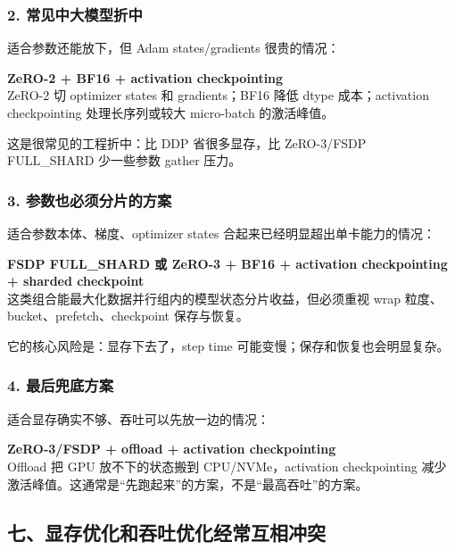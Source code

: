 \subsubsection*{2. 常见中大模型折中}

适合参数还能放下，但 Adam states/gradients 很贵的情况：

\begin{summarybox}
\textbf{ZeRO-2 + BF16 + activation checkpointing}\\
ZeRO-2 切 optimizer states 和 gradients；BF16 降低 dtype 成本；activation checkpointing 处理长序列或较大 micro-batch 的激活峰值。
\end{summarybox}

这是很常见的工程折中：比 DDP 省很多显存，比 ZeRO-3/FSDP FULL\_SHARD 少一些参数 gather 压力。

\subsubsection*{3. 参数也必须分片的方案}

适合参数本体、梯度、optimizer states 合起来已经明显超出单卡能力的情况：

\begin{summarybox}
\textbf{FSDP FULL\_SHARD 或 ZeRO-3 + BF16 + activation checkpointing + sharded checkpoint}\\
这类组合能最大化数据并行组内的模型状态分片收益，但必须重视 wrap 粒度、bucket、prefetch、checkpoint 保存与恢复。
\end{summarybox}

它的核心风险是：显存下去了，step time 可能变慢；保存和恢复也会明显复杂。

\subsubsection*{4. 最后兜底方案}

适合显存确实不够、吞吐可以先放一边的情况：

\begin{summarybox}
\textbf{ZeRO-3/FSDP + offload + activation checkpointing}\\
Offload 把 GPU 放不下的状态搬到 CPU/NVMe，activation checkpointing 减少激活峰值。这通常是“先跑起来”的方案，不是“最高吞吐”的方案。
\end{summarybox}

\subsection{七、显存优化和吞吐优化经常互相冲突}

